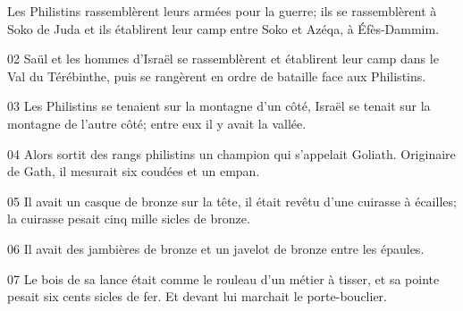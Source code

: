 Les Philistins rassemblèrent leurs armées pour la guerre; ils se rassemblèrent à Soko de Juda et ils établirent leur camp entre Soko et Azéqa, à Éfès-Dammim.

02 Saül et les hommes d’Israël se rassemblèrent et établirent leur camp dans le Val du Térébinthe, puis se rangèrent en ordre de bataille face aux Philistins.

03 Les Philistins se tenaient sur la montagne d’un côté, Israël se tenait sur la montagne de l’autre côté; entre eux il y avait la vallée.

04 Alors sortit des rangs philistins un champion qui s’appelait Goliath. Originaire de Gath, il mesurait six coudées et un empan.

05 Il avait un casque de bronze sur la tête, il était revêtu d’une cuirasse à écailles; la cuirasse pesait cinq mille sicles de bronze.

06 Il avait des jambières de bronze et un javelot de bronze entre les épaules.

07 Le bois de sa lance était comme le rouleau d’un métier à tisser, et sa pointe pesait six cents sicles de fer. Et devant lui marchait le porte-bouclier.
